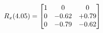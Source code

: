 \documentclass[preview]{standalone}
\begin{document}
\begin{align*}
\special{dvisvgm:raw <g id='unique000'>}R_{x}(4.05) = \begin{bmatrix}1 & 0 & 0 \\0 & -0.62 & +0.79 \\0 & -0.79 & -0.62\end{bmatrix}\special{dvisvgm:raw </g>}
\end{align*}
\end{document}
